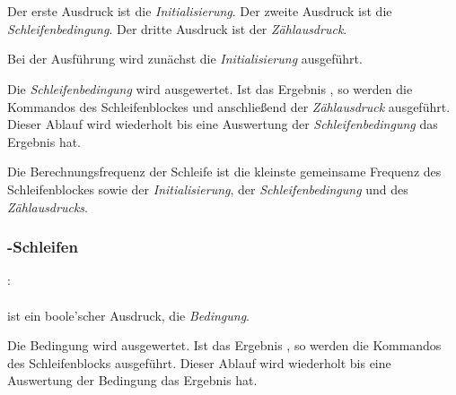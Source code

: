 \hspace*{1cm}\Gspace\Gt{(}\Gspace{} \Gspace\Gt{;}\Gspace{} \Gspace\Gt{;}\Gspace\Gt{)}\Gspace\Gt{\{}\Gspace{} \Gspace\Gt{\}}\\
\hspace*{1cm}\Gspace\Gt{(}\Gspace{} \Gspace\Gt{;}\Gspace{} \Gspace\Gt{;}\Gspace{} \Gspace\Gt{)}\Gspace\Gt{\{}\Gspace{} \Gspace\Gt{\}}\\

Der erste Ausdruck ist die \emph{Initialisierung}. Der zweite Ausdruck ist die \emph{Schleifenbedingung}. Der dritte Ausdruck ist der \emph{Zählausdruck}.

Bei der Ausführung wird zunächst die \emph{Initialisierung} ausgeführt.

Die \emph{Schleifenbedingung} wird ausgewertet. Ist das Ergebnis , so werden die Kommandos des Schleifenblockes
und anschließend der \emph{Zählausdruck} ausgeführt.
Dieser Ablauf wird wiederholt bis eine Auswertung der \emph{Schleifenbedingung} das Ergebnis  hat.

Die Berechnungsfrequenz der Schleife ist die kleinste gemeinsame Frequenz des Schleifenblockes sowie
der \emph{Initialisierung}, der \emph{Schleifenbedingung} und des \emph{Zählausdrucks}.

\subsubsection{-Schleifen}\label{$_backslash$kw__while__-Schleifen}
:\label{schleife_while}\\
\hspace*{1cm}\Gspace\Gt{(}\Gspace{} \Gspace\Gt{)}\Gspace\Gt{\{}\Gspace{} \Gspace\Gt{\}}\\

\glq{}\grq ist ein boole'scher Ausdruck, die \emph{Bedingung}.

Die Bedingung wird ausgewertet. Ist das Ergebnis , so werden die Kommandos des Schleifenblocks
ausgeführt. Dieser Ablauf wird wiederholt bis eine Auswertung der Bedingung das Ergebnis  hat.

